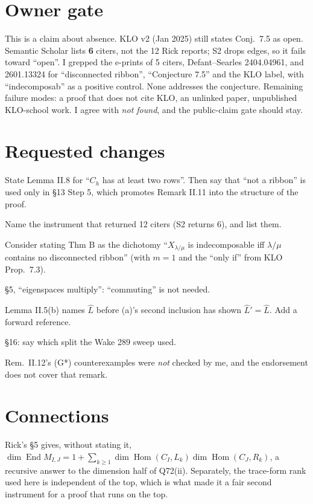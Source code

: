 \documentclass[11pt]{article}
\newcommand{\End}{\operatorname{End}}
\newcommand{\Hom}{\operatorname{Hom}}
\begin{document}
\section{Owner gate}
This is a claim about absence. KLO v2 (Jan 2025) still states Conj.~7.5 as open. Semantic Scholar
lists \textbf{6} citers, not the 12 Rick reports; S2 drops edges, so it fails toward ``open''. I
grepped the e-prints of 5 citers, Defant--Searles 2404.04961, and 2601.13324 for ``disconnected
ribbon'', ``Conjecture 7.5'' and the KLO label, with ``indecomposab'' as a positive control. None
addresses the conjecture. Remaining failure modes: a proof that does not cite KLO, an unlinked
paper, unpublished KLO-school work. I agree with \emph{not found}, and the public-claim gate should
stay.

\section{Requested changes}
\begin{description}[nosep]
\item[S1.] State Lemma II.8 for ``$C_h$ has at least two rows''. Then say that ``not a ribbon'' is
used only in \S13 Step 5, which promotes Remark II.11 into the structure of the proof.
\item[S2.] Name the instrument that returned 12 citers (S2 returns 6), and list them.
\item[S3.] Consider stating Thm B as the dichotomy ``$X_{\lambda/\mu}$ is indecomposable iff
$\lambda/\mu$ contains no disconnected ribbon'' (with $m=1$ and the ``only if'' from KLO
Prop.~7.3).
\item[N1.] \S5, ``eigenspaces multiply'': ``commuting'' is not needed.
\item[N2.] Lemma II.5(b) names $\widehat L$ before (a)'s second inclusion has shown
$\widehat L'=\widehat L$. Add a forward reference.
\item[N3.] \S16: say which split the Wake 289 sweep used.
\item[N4.] Rem.~II.12's (G*) counterexamples were \emph{not} checked by me, and the endorsement
does not cover that remark.
\end{description}

\section{Connections}
Rick's \S5 gives, without stating it,
$\dim\End M_{I,J}=1+\sum_{k\ge1}\dim\Hom(C_I,L_k)\dim\Hom(C_J,R_k)$, a recursive answer to the
dimension half of Q72(ii). Separately, the trace-form rank used here is independent of the top,
which is what made it a fair second instrument for a proof that runs on the top.
\end{document}
